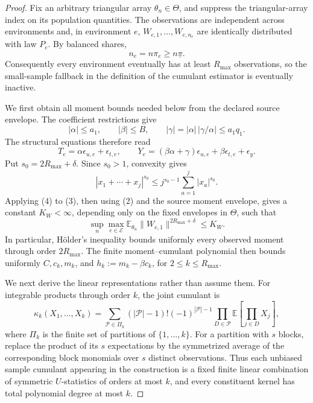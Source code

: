 \documentclass{article}
\begin{document}
\begin{proof}
Fix an arbitrary triangular array \(\theta_n\in\Theta\), and suppress the triangular-array index on its population quantities.  The observations are independent across environments and, in environment \(e\), \(W_{e,1},\ldots,W_{e,n_e}\) are identically distributed with law \(P_e\).  By balanced shares,
\[
 n_e=n\pi_e\geq n\underline\pi. \tag{1}
\]
Consequently every environment eventually has at least \(R_{\max}\) observations, so the small-sample fallback in the definition of the cumulant estimator is eventually inactive.

We first obtain all moment bounds needed below from the declared source envelope.  The coefficient restrictions give
\[
 |\alpha|\leq a_1,
 \qquad |\beta|\leq B,
 \qquad |\gamma|=|\alpha|\,|\gamma/\alpha|\leq a_1q_1. \tag{2}
\]
The structural equations therefore read
\[
 T_e=\alpha\epsilon_{u,e}+\epsilon_{t,e},
 \qquad
 Y_e=(\beta\alpha+\gamma)\epsilon_{u,e}
       +\beta\epsilon_{t,e}+\epsilon_y. \tag{3}
\]
Put \(s_0=2R_{\max}+\delta\).  Since \(s_0>1\), convexity gives
\[
 |x_1+\cdots+x_j|^{s_0}
 \leq j^{s_0-1}\sum_{a=1}^j|x_a|^{s_0}. \tag{4}
\]
Applying (4) to (3), then using (2) and the source moment envelope, gives a constant \(K_W<\infty\), depending only on the fixed envelopes in \(\Theta\), such that
\[
 \sup_n\max_{e\in\mathcal E}
 \mathbb E_{\theta_n}\|W_{e,1}\|^{2R_{\max}+\delta}
 \leq K_W. \tag{5}
\]
In particular, H\"older's inequality bounds uniformly every observed moment through order \(2R_{\max}\).  The finite moment--cumulant polynomial then bounds uniformly \(C,c_k,m_k\), and \(h_k:=m_k-\beta c_k\), for \(2\leq k\leq R_{\max}\).

We next derive the linear representations rather than assume them.  For integrable products through order \(k\), the joint cumulant is
\[
 \kappa_k(X_1,\ldots,X_k)
 =\sum_{\mathcal P\in\Pi_k}
 (|\mathcal P|-1)!(-1)^{|\mathcal P|-1}
 \prod_{D\in\mathcal P}
 \mathbb E\!\left[\prod_{j\in D}X_j\right], \tag{6}
\]
where \(\Pi_k\) is the finite set of partitions of \(\{1,\ldots,k\}\).  For a partition with \(s\) blocks, replace the product of its \(s\) expectations by the symmetrized average of the corresponding block monomials over \(s\) distinct observations.  Thus each unbiased sample cumulant appearing in the construction is a fixed finite linear combination of symmetric \(U\)-statistics of orders at most \(k\), and every constituent kernel has total polynomial degree at most \(k\).


\end{proof}
\end{document}
